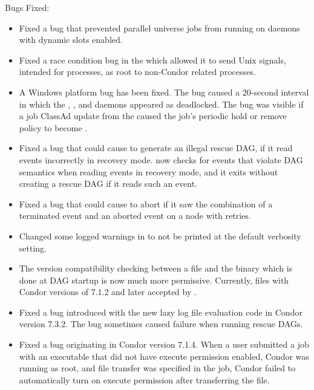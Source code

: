 \noindent Bugs Fixed:

\begin{itemize}

\item Fixed a bug that prevented parallel universe jobs from running 
  on  daemons with dynamic slots enabled.

\item Fixed a race condition bug in the  which allowed
it to send Unix signals, intended for  processes, as
root to non-Condor related processes.

\item A Windows platform bug has been fixed.
The bug caused a 20-second interval in which
the , , and  daemons
appeared as deadlocked. 
The bug was visible if a job ClassAd update from the  caused
the job's periodic hold or remove policy to become .

\item Fixed a bug that could cause  to generate an
illegal rescue DAG, if it read events incorrectly in recovery mode.
 now checks for events that violate DAG semantics
when reading events in recovery mode, and it exits without creating a
rescue DAG if it reads such an event.

\item Fixed a bug that could cause  to abort if it saw
the combination of a terminated event and an aborted event on a node with
retries.

\item Changed some logged warnings in  to not be
printed at the default verbosity setting.

\item The version compatibility checking between a 
file and the  binary which is done at DAG startup
is now much more permissive.
Currently,  files with
Condor versions of 7.1.2 and later accepted by .

\item Fixed a bug introduced with the new  lazy log file
evaluation code in Condor version 7.3.2.
The bug sometimes caused failure when running rescue DAGs.

\item Fixed a bug originating in Condor version 7.1.4.
When a user submitted a job
with an executable that did not have execute permission enabled,
Condor was running as root, and file transfer was specified in the job,
Condor failed to automatically turn on execute permission after
transferring the file.


\end{itemize}
